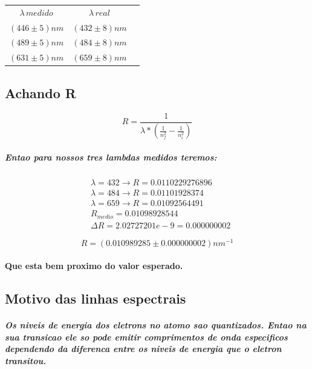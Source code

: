 \documentclass[12pt,twoside, a4paper, twocolumn]{article}
\begin{document}
\begin{center}
  \begin{tabular}{ |c|c|c| }
    \hline
    $\lambda \, medido$ & $\lambda \, real$ \\
    $(446 \pm 5)nm$     & $(432 \pm 8)nm$   \\
    $(489 \pm 5)nm$     & $(484 \pm 8)nm$   \\
    $(631 \pm 5)nm$     & $(659 \pm 8) nm$  \\
    \hline
  \end{tabular}
\end{center}

\subsection{Achando R}

\begin{equation}
  R = \frac{1}{\lambda * \left(\frac{1}{n_f^2} - \frac{1}{n_i^2}\right)}
\end{equation}

\subparagraph*{Entao para nossos tres lambdas medidos teremos:}

\begin{equation}
  \begin{aligned}
     & \lambda = 432 \rightarrow R = 0.0110229276896 \\
     & \lambda = 484 \rightarrow R = 0.01101928374   \\
     & \lambda = 659 \rightarrow R = 0.01092564491   \\
     & R_{medio} = 0.01098928544                     \\
     & \varDelta R = 2.02727201e-9 = 0.000000002
  \end{aligned}
\end{equation}

\begin{equation}
  R = (0.010989285 \pm 0.000000002)nm^{-1}
\end{equation}

\paragraph*{Que esta bem proximo do valor esperado.}

\subsection{Motivo das linhas espectrais}

\subparagraph*{Os niveis de energia dos eletrons no atomo sao quantizados. Entao na sua transicao ele so pode emitir comprimentos de onda especificos dependendo da diferenca entre os niveis de energia que o eletron transitou.}
\end{document}

